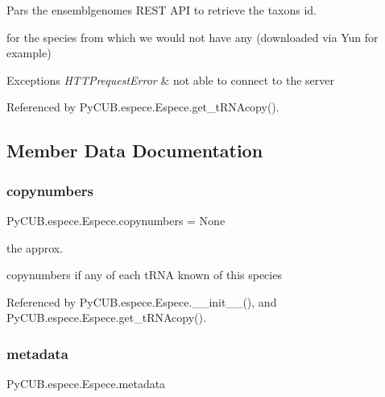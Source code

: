 Pars the ensemblgenomes R\+E\+ST A\+PI to retrieve the taxons id. 

for the species from which we would not have any (downloaded via Yun for example)


\begin{DoxyExceptions}{Exceptions}
{\em H\+T\+T\+Prequest\+Error} & not able to connect to the server \\
\hline
\end{DoxyExceptions}


Referenced by Py\+C\+U\+B.\+espece.\+Espece.\+get\+\_\+t\+R\+N\+Acopy().



\subsection{Member Data Documentation}
\mbox{\label{class_py_c_u_b_1_1espece_1_1_espece_a89cd4e211bf028a4d141202e8a885b58}} 
\subsubsection{\texorpdfstring{copynumbers}{copynumbers}}
{\footnotesize\ttfamily Py\+C\+U\+B.\+espece.\+Espece.\+copynumbers = None\hspace{0.3cm}{\ttfamily [static]}}



the approx. 

copynumbers if any of each t\+R\+NA known of this species 

Referenced by Py\+C\+U\+B.\+espece.\+Espece.\+\_\+\+\_\+init\+\_\+\+\_\+(), and Py\+C\+U\+B.\+espece.\+Espece.\+get\+\_\+t\+R\+N\+Acopy().

\mbox{\label{class_py_c_u_b_1_1espece_1_1_espece_ae98c1d182e761e4c09a10f8a9994124e}} 
\subsubsection{\texorpdfstring{metadata}{metadata}}
{\footnotesize\ttfamily Py\+C\+U\+B.\+espece.\+Espece.\+metadata\hspace{0.3cm}{\ttfamily [static]}}


